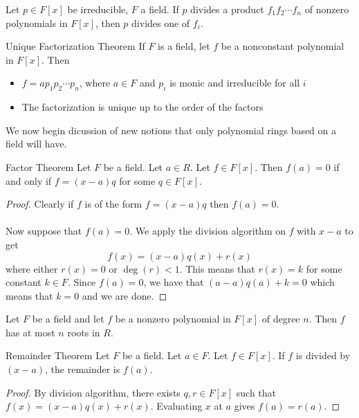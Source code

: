 \documentclass[a4paper]{article}
\begin{document}
\begin{prp}{}{} Let $p\in F[x]$ be irreducible, $F$ a field. If $p$ divides a product $f_1f_2\cdots f_n$ of nonzero polynomials in $F[x]$, then $p$ divides one of $f_i$. 
\end{prp}

\begin{thm}{Unique Factorization Theorem}{} If $F$ is a field, let $f$ be a nonconstant polynomial in $F[x]$. Then 
\begin{itemize}
\item $f=ap_1p_2\cdots p_n$, where $a\in F$ and $p_i$ is monic and irreducible for all $i$
\item The factorization is unique up to the order of the factors
\end{itemize}
\end{thm}

We now begin dicussion of new notions that only polynomial rings based on a field will have. 

\begin{thm}{Factor Theorem}{} Let $F$ be a field. Let $a\in R$. Let $f\in F[x]$. Then $f(a)=0$ if and only if $f=(x-a)q$ for some $q\in F[x]$. \tcbline
\begin{proof}
Clearly if $f$ is of the form $f=(x-a)q$ then $f(a)=0$. \\~\\
Now suppose that $f(a)=0$. We apply the division algorithm on $f$ with $x-a$ to get $$f(x)=(x-a)q(x)+r(x)$$ where either $r(x)=0$ or $\deg(r)<1$. This means that $r(x)=k$ for some constant $k\in F$. Since $f(a)=0$, we have that $(a-a)q(a)+k=0$ which means that $k=0$ and we are done. 
\end{proof}
\end{thm}

\begin{prp}{}{} Let $F$ be a field and let $f$ be a nonzero polynomial in $F[x]$ of degree $n$. Then $f$ has at most $n$ roots in $R$. 
\end{prp}

\begin{thm}{Remainder Theorem}{} Let $F$ be a field. Let $a\in F$. Let $f\in F[x]$. If $f$ is divided by $(x-a)$, the remainder is $f(a)$. \tcbline
\begin{proof}
By division algorithm, there exists $q,r\in F[x]$ such that $f(x)=(x-a)q(x)+r(x)$. Evaluating $x$ at $a$ gives $f(a)=r(a)$. 
\end{proof}
\end{thm}
\end{document}
